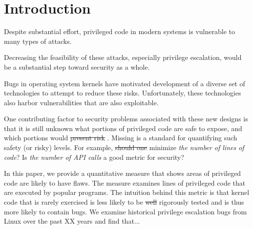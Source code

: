 \section{Introduction}
\label{sec.introduction}

Despite substantial effort, privileged code in modern systems is vulnerable 
to many types of attacks. 

Decreasing the feasibility of these attacks, especially privilege escalation, 
would be a substantial step toward security as a whole. 

Bugs in operating system kernels have motivated development of a diverse set of
technologies to attempt to reduce these risks.    Unfortunately, these technologies also 
harbor vulnerabilities that are also exploitable.

One contributing factor to security problems associated with these new designs is
that it is still unknown what portions of privileged code are
safe to expose, and which portions would \sout{present risk} . 
Missing is a standard for quantifying such safety (or risky) levels. For example, 
\sout{should one} minimize 
\textit{the number of lines of code}?   Is \textit{the number of API 
calls} a good metric for security?    

In this paper, we provide a quantitative measure that shows
areas of privileged code are likely to have flaws.    
The measure examines lines of privileged code that are executed by popular 
programs.  The intuition behind this metric is that kernel code 
that is rarely exercised  is less likely to be \sout{well} 
rigorously tested and is thus more likely to contain bugs.  We examine historical privilege 
escalation bugs from Linux over the past XX years and find that...

